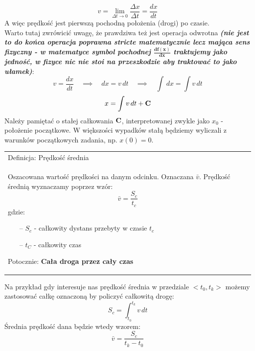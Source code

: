 \documentclass[a4paper]{article}
\newenvironment{definition}[2][Definicja]
    {
        \begin{center}
        \begin{tabular}{|p{1\textwidth}|}
        \hline
            #1: #2\\[2ex]
        \begin{em}
        \Large
    }
    { 
        \end{em}
        \\\hline
        \end{tabular} 
        \end{center}
    }
\begin{document}
        \[v = \lim_{\Delta t \rightarrow 0}{\frac{\Delta x}{\Delta t}} = \frac{dx}{dt}\]
        A więc prędkość jest pierwszą pochodną położenia (drogi) po czasie.\\
        Warto tutaj zwrówicić uwagę, że prawdziwa też jest operacja odwrotna \textit{\textbf{(nie jest to do końca 
        operacja poprawna stricte matematycznie lecz mająca sens fizyczny - w matematyce symbol pochodnej
        $\mathbf{\frac{d f(x)}{dx}}$ traktujemy jako jedność, w fizyce nic nie stoi na przeszkodzie aby traktować to jako ułamek)}}:
        \[v = \frac{dx}{dt}  \quad  \implies \quad dx = v\,dt \quad  \implies \quad \int\,dx = \int v\,dt\]
        \[x = \int v\,dt + \bold{C}\]
        Należy pamiętać o stałej całkowania $\bold{C}$, interpretowanej zwykle jako $x_0$ - położenie początkowe. W większości
        wypadków stałą będziemy wyliczali z warunków początkowych zadania, np. $\mathit{x(0) = 0}$. 

        \begin{definition}{Prędkość średnia}
            Oszacowana wartość prędkości na danym odcinku. Oznaczana $\bar{v}$. Prędkość średnią wyznaczamy poprzez wzór:
            \[\bar{v} = \frac{S_c}{t_c}\]
            gdzie:
            \begin{itemize}
                \item[--] $S_c$ - całkowity dystans przebyty w czasie $t_c$
                \item[--] $t_C$ - całkowity czas
            \end{itemize}
            Potocznie: \textbf{Cała droga przez cały czas}
        \end{definition}
        Na przykład gdy interesuje nas prędkość średnia w przedziale $<t_0, t_k>$ możemy zastosować całkę oznaczoną by policzyć
        całkowitą drogę:
        \[S_c = \int_{t_0}^{t_k} v\,dt\]
        Średnia prędkość dana będzie wtedy wzorem:
        \[\bar{v} = \frac{S_c}{t_k - t_0}\]
    \pagebreak
\end{document}
